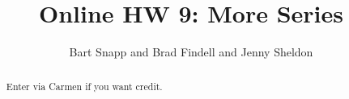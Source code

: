 \documentclass[handout,space,nooutcomes]{xourse}
\title{Online HW 9: More Series}
\author{Bart Snapp and Brad Findell and Jenny Sheldon}
\begin{document}
\begin{abstract}
Enter via Carmen if you want credit.   
\end{abstract}
\maketitle


\end{document}
